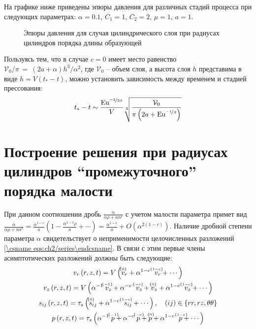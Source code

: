 На графике ниже приведены эпюры давления для различных стадий процесса при следующих параметрах: $\alpha=0.1$, $C_1=1$, $C_2=2$, $\mu=1$, $a=1$.
\begin{figure}[ht]
  \caption{Эпюры давления для случая цилиндрического слоя при радиусах цилиндров порядка длины образующей}
  \label{fig:ch2/sec5/pressure}
\end{figure}

Пользуясь тем, что в случае $c=0$ имеет место равенство $\mathcal{V}_0 / \pi~=~\left(2a + \alpha\right) h^{3} / \alpha^{2}$, где $\mathcal{V}_0$ -- объем слоя, а высота слоя $h$ представима в виде $h=V \left(t_*-t\right)$, можно установить зависимость между временем и стадией прессования:
\begin{equation}
  t_* - t \sim \frac{\text{Eu}^{\nicefrac{-2}{3\beta}}}{V}\sqrt[3]{\frac{\mathcal{V}_0}{\pi\left(2a+\text{Eu}^{\nicefrac{-1}{\beta}}\right)}}
\end{equation}

\section{Построение решения при радиусах цилиндров ``промежуточного'' порядка малости}\label{sec:ch2/sec6}

При данном соотношении дробь $\frac{\alpha}{\alpha\rho+a \alpha^c}$ с учетом малости параметра примет вид $\frac{\alpha}{\alpha\rho+a \alpha^c} = \frac{\alpha^{1-c}}{a}\left(1-\frac{\alpha^{1-c}\rho}{a}+\cdots\right) = \frac{\alpha^{1-c}}{a} + O\left(\alpha^{2\left(1-c\right)}\right)$.
Наличие дробной степени параметра $\alpha$ свидетельствует о неприменимости целочисленных разложений \cref{\csname eqs:ch2/series\endcsname}. В связи с этим первые члены асимптотических разложений должны быть следующие:
\begin{gather}
  \label{eqs:ch2/sec6/series/vr}
  v_{r}\left(r, z, t\right) = V \left(\uindex{v}{0}_{r} + \alpha^{1-c} \;\ \uindex{v}{1-c}_{r} + \cdots\right)
  \\
  \label{eqs:ch2/sec6/series/vz}
  v_{z}\left(r, z, t\right) = V \left(\alpha^{-1} \; \uindex{v}{-1}_{z} + \alpha^{-c} \;\ \uindex{v}{-c}_{z} + \uindex{v}{0}_{z} + \alpha^{1-c} \;\ \uindex{v}{1-c}_{z} + \cdots\right)
  \\
  \label{eqs:ch2/sec6/series/sij}
  s_{ij}\left(r, z, t\right) = \tau_{s} \left(\uindex{s}{0}_{ij} + \alpha^{1-c} \;\ \uindex{s}{1-c}_{ij} + \cdots\right), \quad (ij)\in\{rr, rz, \theta\theta\}
  \\
  \label{eqs:ch2/sec6/series/p}
  p\left(r, z, t \right) = \tau_{s} \left(\alpha^{-1} \; \uindex{p}{-1} + \alpha^{-c} \; \uindex{p}{-c} + \uindex{p}{0} + \alpha^{1-c} \;\ \uindex{p}{1-c} + \cdots\right)
\end{gather}

